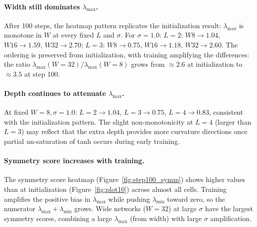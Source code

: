 \documentclass[12pt,a4paper]{article}
\begin{document}
\paragraph{Width still dominates $\lambda_{\max}$.}
After 100 steps, the heatmap pattern replicates the initialization result: $\lambda_{\max}$ is monotone in $W$ at every fixed $L$ and $\sigma$.
For $\sigma=1.0$: $L=2$: $W8 \to 1.04$, $W16 \to 1.59$, $W32 \to 2.70$; $L=3$: $W8 \to 0.75$, $W16 \to 1.18$, $W32 \to 2.60$.
The ordering is preserved from initialization, with training amplifying the differences: the ratio $\lambda_{\max}(W=32)/\lambda_{\max}(W=8)$ grows from $\approx 2.6$ at initialization to $\approx 3.5$ at step 100.

\paragraph{Depth continues to attenuate $\lambda_{\max}$.}
At fixed $W=8, \sigma=1.0$: $L=2 \to 1.04$, $L=3 \to 0.75$, $L=4 \to 0.83$, consistent with the initialization pattern. The slight non-monotonicity at $L=4$ (larger than $L=3$) may reflect that the extra depth provides more curvature directions once partial un-saturation of tanh occurs during early training.

\paragraph{Symmetry score increases with training.}
The symmetry score heatmap (Figure~\ref{fig:step100_symm}) shows higher values than at initialization (Figure~\ref{fig:plot10}) across almost all cells. Training amplifies the positive bias in $\lambda_{\max}$ while pushing $\lambda_{\min}$ toward zero, so the numerator $\lambda_{\max} + \lambda_{\min}$ grows. Wide networks ($W=32$) at large $\sigma$ have the largest symmetry scores, combining a large $\lambda_{\max}$ (from width) with large $\sigma$ amplification.
\end{document}
